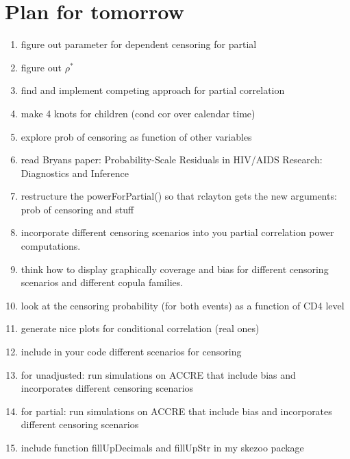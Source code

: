 \documentclass[]{article}
\begin{document}
\section{Plan for tomorrow}
\begin{enumerate}
  \item figure out parameter for dependent censoring for partial
  \item figure out $\rho^*$
  \item find and implement competing approach for partial correlation
  \item make 4 knots for children (cond cor over calendar time)
  \item explore prob of censoring as function of other variables 
  \item read Bryans paper: Probability-Scale Residuals in HIV/AIDS Research: Diagnostics and Inference
  \item restructure the powerForPartial() so that rclayton gets the new arguments: prob of censoring and stuff
  \item incorporate different censoring scenarios into you partial correlation power computations.
  \item think how to display graphically coverage and bias for different censoring scenarios and different copula families.
  \item look at the censoring probability (for both events) as a function of CD4 level
  \item generate nice plots for conditional correlation (real ones)
  \item include in your code different  scenarios for censoring
  \item for unadjusted: run simulations on ACCRE that include bias and incorporates different censoring scenarios
  \item for partial: run simulations on ACCRE that include bias and incorporates different censoring scenarios
  \item include function fillUpDecimals and fillUpStr in my skezoo package
\end{enumerate}
\end{document}
